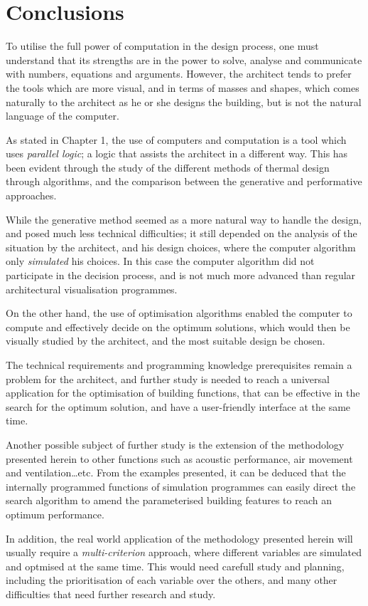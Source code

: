 \clearpage
\section{Conclusions}

To utilise the full power of computation in the design process, one must understand that its strengths are in the power to solve, analyse and communicate with numbers, equations and arguments. However, the architect tends to prefer the tools which are more visual, and in terms of masses and shapes, which comes naturally to the architect as he or she designs the building, but is not the natural language of the computer.

As stated in Chapter 1, the use of computers and computation is a tool which uses \emph{parallel logic}; a logic that assists the architect in a different way. This has been evident through the study of the different methods of thermal design through algorithms, and the comparison between the generative and performative approaches.

While the generative method seemed as a more natural way to handle the design, and posed much less technical difficulties; it still depended on the analysis of the situation by the architect, and his design choices, where the computer algorithm only \emph{simulated} his choices. In this case the computer algorithm did not participate in the decision process, and is not much more advanced than regular architectural visualisation programmes.

On the other hand, the use of optimisation algorithms enabled the computer to compute and effectively decide on the optimum solutions, which would then be visually studied by the architect, and the most suitable design be chosen.

The technical requirements and programming knowledge prerequisites remain a problem for the architect, and further study is needed to reach a universal application for the optimisation of building functions, that can be effective in the search for the optimum solution, and have a user-friendly interface at the same time.

Another possible subject of further study is the extension of the methodology presented herein to other functions such as acoustic performance, air movement and ventilation\dots{}etc. From the examples presented, it can be deduced that the internally programmed functions of simulation programmes can easily direct the search algorithm to amend the parameterised building features to reach an optimum performance.

In addition, the real world application of the methodology presented herein will usually require a \emph{multi-criterion} approach, where different variables are simulated and optmised at the same time. This would need carefull study and planning, including the prioritisation of each variable over the others, and many other difficulties that need further research and study.
